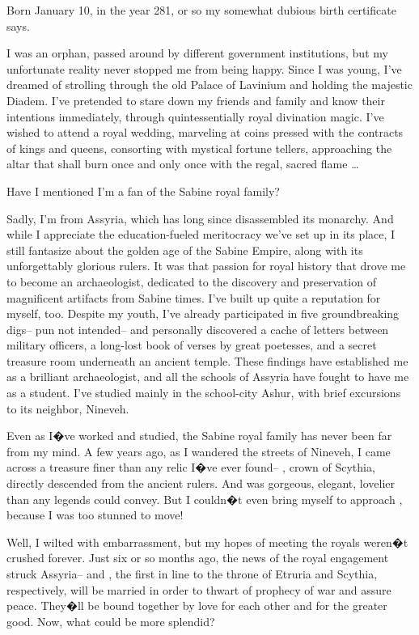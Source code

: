 \documentclass[char]{Kos}
\begin{document}
\name{\cArchaeologist{}}

Born January 10, in the year 281, or so my somewhat dubious birth certificate says.

I was an orphan, passed around by different government institutions, but my unfortunate reality never stopped me from being happy. Since I was young, I've dreamed of strolling through the old Palace of Lavinium and holding the majestic Diadem. I've pretended to stare down my friends and family and know their intentions immediately, through quintessentially royal divination magic. I've wished to attend a royal wedding, marveling at coins pressed with the contracts of kings and queens, consorting with mystical fortune tellers, approaching the altar that shall burn once and only once with the regal, sacred flame \ldots{}

Have I mentioned I'm a fan of the Sabine royal family?

Sadly, I'm from Assyria, which has long since disassembled its monarchy. And while I appreciate the education-fueled meritocracy we've set up in its place, I still fantasize about the golden age of the Sabine Empire, along with its unforgettably glorious rulers. It was that passion for royal history that drove me to become an archaeologist, dedicated to the discovery and preservation of magnificent artifacts from Sabine times. I've built up quite a reputation for myself, too. Despite my youth, I've already participated in five groundbreaking digs-- pun not intended-- and personally discovered a cache of letters between military officers, a long-lost book of verses by great poetesses, and a secret treasure room underneath an ancient temple. These findings have established me as a brilliant archaeologist, and all the schools of Assyria have fought to have me as a student. I've studied mainly in the school-city Ashur, with brief excursions to its neighbor, Nineveh.

Even as I�ve worked and studied, the Sabine royal family has never been far from my mind. A few years ago, as I wandered the streets of Nineveh, I came across a treasure finer than any relic I�ve ever found-- \cBride{\intro}, crown \cBride{\prince} of Scythia, directly descended from the ancient rulers. And \cBride{\they} was gorgeous, elegant, lovelier than any legends could convey. But I couldn�t even bring myself to approach \cBride{\them}, because I was too stunned to move!

Well, I wilted with embarrassment, but my hopes of meeting the royals weren�t crushed forever. Just six or so months ago, the news of the royal engagement struck Assyria-- \cBride{} and \cGroom{}, the first in line to the throne of Etruria and Scythia, respectively, will be married in order to thwart of prophecy of war and assure peace. They�ll be bound together by love for each other and for the greater good. Now, what could be more splendid?
\end{document}
